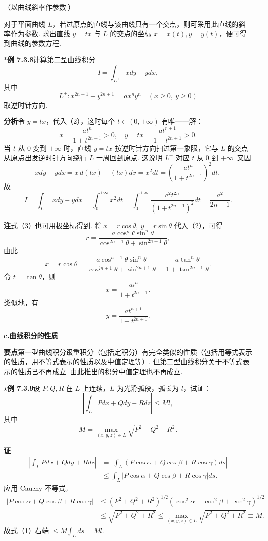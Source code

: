 \documentclass[UTF8, 12pt, fontset=fandol, oneside]{ctexart}
\begin{document}
（以曲线斜率作参数.）

对于平面曲线 $L$，若过原点的直线与该曲线只有一个交点，则可采用此直线的斜率作为参数. 求出直线 $y=tx$ 与 $L$ 的交点的坐标 $x=x(t),y=y(t)$，便可得到曲线的参数方程.

\noindent\textbf{$*$例 7.3.8}\quad 计算第二型曲线积分
\[
I=\int_{L^+}xdy-ydx, \tag{1}
\]
其中
\[
L^+:x^{2n+1}+y^{2n+1}=ax^ny^n\quad(x\ge0,\ y\ge0) \tag{2}
\]
取逆时针方向.

\noindent\textbf{分析}\quad 令 $y=tx$，代入（2），这时每个 $t\in(0,+\infty)$ 有唯一一解：
\[
x=\frac{at^n}{1+t^{2n+1}}>0,\quad
y=tx=\frac{at^{n+1}}{1+t^{2n+1}}>0. \tag{3}
\]
当 $t$ 从 $0$ 变到 $+\infty$ 时，直线 $y=tx$ 按逆时针方向扫过第一象限，它与 $L$ 的交点从原点出发逆时针方向绕行 $L$ 一周回到原点. 这说明 $L^+$ 对应 $t$ 从 $0$ 到 $+\infty$. 又因
\[
xdy-ydx=x\,d(tx)-(tx)dx=x^2dt=
\left(\frac{at^n}{1+t^{2n+1}}\right)^2dt,
\]
故
\[
I=\int_{L^+}xdy-ydx=\int_0^{+\infty}x^2dt
=\int_0^{+\infty}\frac{a^2t^{2n}}{(1+t^{2n+1})^2}dt
=\frac{a^2}{2n+1}.
\]

\noindent\textbf{注}\quad 式（3）也可用极坐标得到. 将 $x=r\cos\theta,\ y=r\sin\theta$ 代入（2），可得
\[
r=\frac{a\cos^n\theta\sin^n\theta}{\cos^{2n+1}\theta+\sin^{2n+1}\theta},
\]
由此
\[
x=r\cos\theta=
\frac{a\cos^{n+1}\theta\sin^n\theta}{\cos^{2n+1}\theta+\sin^{2n+1}\theta}
=\frac{a\tan^n\theta}{1+\tan^{2n+1}\theta}.
\]
令 $t=\tan\theta$，则
\[
x=\frac{at^n}{1+t^{2n+1}}.
\]
类似地，有
\[
y=\frac{at^{n+1}}{1+t^{2n+1}}.
\]

\noindent\textbf{c.\quad 曲线积分的性质}

\noindent\textbf{要点}\quad 第一型曲线积分跟重积分（包括定积分）有完全类似的性质（包括用等式表示的性质，用不等式表示的性质以及中值定理等）. 但第二型曲线积分关于不等式表示的性质已不再成立. 由此推出的积分中值定理也不再成立.

\noindent\textbf{$\star$例 7.3.9}\quad 设 $P,Q,R$ 在 $L$ 上连续，$L$ 为光滑弧段，弧长为 $l$，试证：
\[
\left|\int_LPdx+Qdy+Rdz\right|\le Ml,
\]
其中
\[
M=\max_{(x,y,z)\in L}\sqrt{P^2+Q^2+R^2}.
\]

\noindent\textbf{证}\quad
\begin{equation}
\begin{aligned}
\left|\int_LPdx+Qdy+Rdz\right|
&=\left|\int_L(P\cos\alpha+Q\cos\beta+R\cos\gamma)ds\right|\\
&\le\int_L|P\cos\alpha+Q\cos\beta+R\cos\gamma|ds.
\end{aligned}
\tag{1}
\end{equation}
应用 Cauchy 不等式，
\[
\begin{aligned}
|P\cos\alpha+Q\cos\beta+R\cos\gamma|
&\le(P^2+Q^2+R^2)^{1/2}
(\cos^2\alpha+\cos^2\beta+\cos^2\gamma)^{1/2}\\
&\le\sqrt{P^2+Q^2+R^2}
\le\max_{(x,y,z)\in L}\sqrt{P^2+Q^2+R^2}\equiv M.
\end{aligned}
\]
故式（1）右端 $\le M\int_Lds=Ml$.
\end{document}
